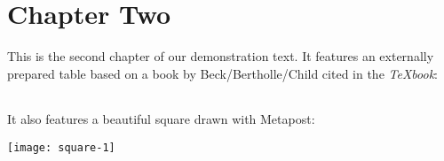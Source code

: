 

%
%

\chapter{Chapter Two}
This is the second chapter of our demonstration text.  It features an
externally prepared table based on a book by Beck/Bertholle/Child
cited in the \emph{\TeX book}:


\begin{tabular}{rcccl}

\end{tabular}

It also features a beautiful square drawn with Metapost:

\begin{center}
\texttt{[image: square-1]}
\end{center}

